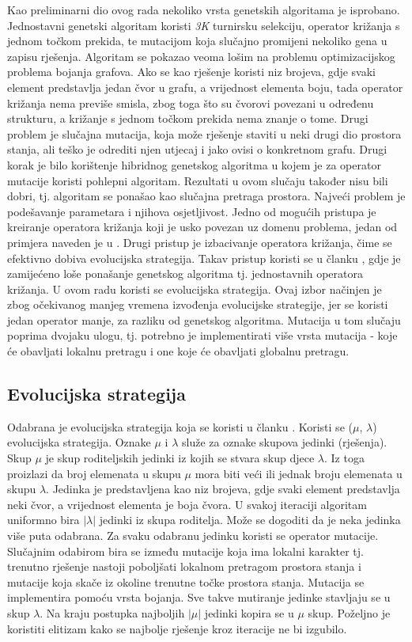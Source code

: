 \documentclass[times, utf8, diplomski, numeric]{fer}
\begin{document}
Kao preliminarni dio ovog rada nekoliko vrsta genetskih algoritama je isprobano. Jednostavni genetski algoritam koristi \emph{3K} turnirsku selekciju, operator križanja s jednom točkom prekida, te mutacijom koja slučajno promijeni nekoliko gena u zapisu rješenja. Algoritam se pokazao veoma lošim na problemu optimizacijskog problema bojanja grafova. Ako se kao rješenje koristi niz brojeva, gdje svaki element predstavlja jedan čvor u grafu, a vrijednost elementa boju, tada operator križanja nema previše smisla, zbog toga što su čvorovi povezani u određenu strukturu, a križanje s jednom točkom prekida nema znanje o tome. Drugi problem je slučajna mutacija, koja može rješenje staviti u neki drugi dio prostora stanja, ali teško je odrediti njen utjecaj i jako ovisi o konkretnom grafu. Drugi korak je bilo korištenje hibridnog genetskog algoritma u kojem je za operator mutacije koristi pohlepni algoritam. Rezultati u ovom slučaju također nisu bili dobri, tj. algoritam se ponašao kao slučajna pretraga prostora. Najveći problem je podešavanje parametara i njihova osjetljivost. Jedno od mogućih pristupa je kreiranje operatora križanja koji je usko povezan uz domenu problema, jedan od primjera naveden je u \cite{lit17}. Drugi pristup je izbacivanje operatora križanja, čime se efektivno dobiva evolucijska strategija. Takav pristup koristi se u članku \cite{lit12}, gdje je zamijećeno loše ponašanje genetskog algoritma tj. jednostavnih operatora križanja. U ovom radu koristi se evolucijska strategija. Ovaj izbor načinjen je zbog očekivanog manjeg vremena izvođenja evolucijske strategije, jer se koristi jedan operator manje, za razliku od genetskog algoritma. Mutacija u tom slučaju poprima dvojaku ulogu, tj. potrebno je implementirati više vrsta mutacija - koje će obavljati lokalnu pretragu i one koje će obavljati globalnu pretragu.

\subsection{Evolucijska strategija}

Odabrana je evolucijska strategija koja se koristi u članku \cite{lit17}. Koristi se ($\mu$, $\lambda$) evolucijska strategija. Oznake $\mu$ i $\lambda$ služe za oznake skupova jedinki (rješenja). Skup $\mu$ je skup roditeljskih jedinki iz kojih se stvara skup djece $\lambda$. Iz toga proizlazi da broj elemenata u skupu $\mu$ mora biti veći ili jednak broju elemenata u skupu $\lambda$. Jedinka je predstavljena kao niz brojeva, gdje svaki element predstavlja neki čvor, a vrijednost elementa je boja čvora. U svakoj iteraciji algoritam uniformno bira $|\lambda|$ jedinki iz skupa roditelja. Može se dogoditi da je neka jedinka više puta odabrana. Za svaku odabranu jedinku koristi se operator mutacije. Slučajnim odabirom bira se između mutacije koja ima lokalni karakter tj. trenutno rješenje nastoji poboljšati lokalnom pretragom prostora stanja i mutacije koja skače iz okoline trenutne točke prostora stanja. Mutacija se implementira pomoću vrsta bojanja. Sve takve mutiranje jedinke stavljaju se u skup $\lambda$. Na kraju postupka najboljih $|\mu|$ jedinki kopira se u $\mu$ skup. Poželjno je koristiti elitizam kako se najbolje rješenje kroz iteracije ne bi izgubilo.
\end{document}
